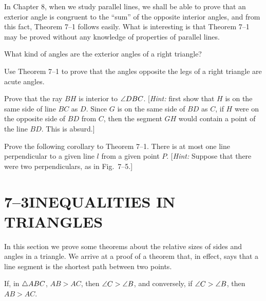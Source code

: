 \documentclass[11pt]{book}
\begin{document}
\FIGVIIFOUR

\begin{remark}
In Chapter 8, when we study parallel lines, we shall be able to prove that an
exterior angle is congruent to the ``sum'' of the opposite interior angles, and
from this fact, Theorem 7--1 follows easily. What is interesting is that
Theorem 7--1 may be proved without any knowledge of properties of parallel
lines.
\end{remark}

\begin{exercisecols}
\begin{exlist}
\item What kind of angles are the exterior angles of a right triangle?
\item Use Theorem 7--1 to prove that the angles opposite the legs of a right
  triangle are acute angles.
\item[\stex 3.] Prove that the ray $BH$ is interior to $\angle DBC$.
  [\emph{Hint:} first show that $H$ is on the same side of line $BC$ as $D$.
  Since $G$ is on the same side of $BD$ as $C$, if $H$ were on the opposite
  side of $BD$ from $C$, then the segment $GH$ would contain a point of the
  line $BD$. This is absurd.]
\item Prove the following corollary to Theorem 7--1. There is at most one line
  perpendicular to a given line $l$ from a given point $P$. [\emph{Hint:}
  Suppose that there were two perpendiculars, as in Fig.~7--5.]
\exfig{\FIGVIIFIVE}
\end{exlist}
\end{exercisecols}

\section*{7--3\quad INEQUALITIES IN TRIANGLES}

In this section we prove some theorems about the relative sizes of sides and
angles in a triangle. We arrive at a proof of a theorem that, in effect, says
that a line segment is the shortest path between two points.

\begin{theorem}
If, in $\triangle ABC$, $AB > AC$, then $\angle C > \angle B$, and conversely, if
$\angle C > \angle B$, then $AB > AC$.
\end{theorem}
\end{document}
